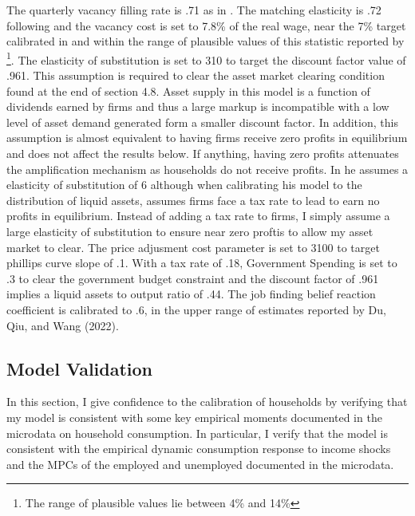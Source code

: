 \documentclass[titlepage]{\econtex}\providecommand{\texname}{Dissertation-Proposal}
\begin{document}
The quarterly vacancy filling rate is .71 as in \cite{Wouter2000}. The matching elasticity is .72 following \cite{SilvaToledo} and the vacancy cost is set to 7.8\% of the real wage, near the 7\% target calibrated in \cite{Christiano2016} and within the range of plausible values of this statistic reported by \cite{SilvaToledo}\footnote{The range of plausible values lie between 4\% and 14\%}. The elasticity of substitution is set to 310 to target the discount factor value of .961. This assumption is required to clear the asset market clearing condition found at the end of section 4.8. Asset supply in this model is a function of dividends earned by firms and thus a large markup is incompatible with a low level of asset demand generated form a smaller discount factor. In addition, this assumption is almost equivalent to having firms receive zero profits in equilibrium and does not affect the results below. If anything, having zero profits attenuates the amplification mechanism as households do not receive profits. In \cite{Kekre2021} he assumes a elasticity of substitution of 6 although when calibrating his model to the distribution of liquid assets, assumes firms face a tax rate to lead to earn no profits in equilibrium. Instead of adding a tax rate to firms, I simply assume a large elasticity of substitution to ensure near zero proftis to allow my asset market to clear. The price adjusment cost parameter is set to 3100 to target phillips curve slope of .1. With a tax rate of .18,  Government Spending is set to .3 to clear the government budget constraint and the discount factor of .961 implies a liquid assets to output ratio of .44.  The job finding belief reaction coefficient is calibrated to .6, in the upper range of estimates reported by Du, Qiu, and Wang (2022).



\hypertarget{Model Validation }{}
\subsection{Model Validation }

In this section, I give confidence to the calibration of households by verifying that my model is consistent with some key empirical moments documented in the microdata on household consumption. In particular, I verify that the model is consistent with the empirical dynamic consumption response to income shocks and the MPCs of the employed and unemployed documented in the microdata.  \\
\end{document}
